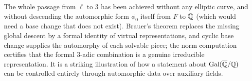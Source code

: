 \documentclass[11pt]{article}
\begin{document}
\begin{remark}
The whole passage from $\ell$ to $3$ has been achieved without any elliptic
curve, and without descending the automorphic form $\phi_0$ itself from $F$ to
$\mathbb{Q}$ (which would need a base change that does not exist). Brauer's theorem
replaces the missing global descent by a formal identity of virtual
representations, and cyclic base change supplies the automorphy of each solvable
piece; the norm computation certifies that the formal $3$-adic combination is a
genuine irreducible representation. It is a striking illustration of how a
statement about $\operatorname{Gal}(\overline{\mathbb{Q}}/\mathbb{Q})$ can be controlled entirely through automorphic data over
auxiliary fields.
\end{remark}
\end{document}

